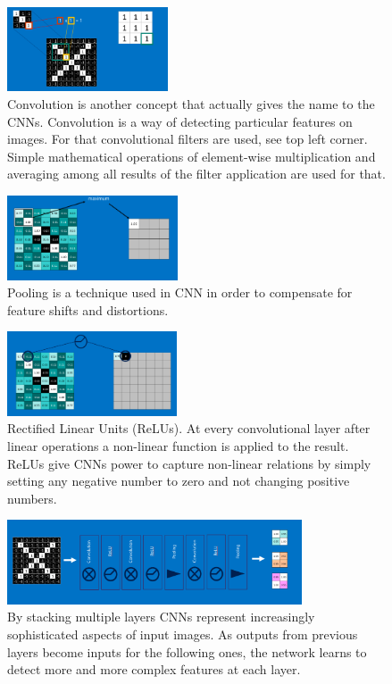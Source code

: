\documentclass[a4paper]{article}
\begin{document}
    \begin{figure}[H]
        \centering
            \includegraphics[width=\textwidth,height=2.5cm,keepaspectratio]{cnn5.png}
        \caption{Convolution is another concept that actually gives the name to the CNNs.
        Convolution is a way of detecting particular features on images. For that convolutional filters
        are used, see top left corner. Simple mathematical operations of element-wise multiplication
        and averaging among all results of the filter application are used for that.}
    \end{figure}
    
    \begin{figure}[H]
        \centering
            \includegraphics[width=\textwidth,height=2.5cm,keepaspectratio]{cnn8.png}
        \caption{Pooling is a technique used in CNN in order to compensate for feature shifts 
        and distortions.}
    \end{figure}
    
    \begin{figure}[H]
        \centering
            \includegraphics[width=\textwidth,height=2.5cm,keepaspectratio]{cnn10.png}
        \caption{Rectified Linear Units (ReLUs). At every convolutional layer after linear operations
        a non-linear function is applied to the result. ReLUs give CNNs power to capture
        non-linear relations by simply setting any negative number to zero and not changing
        positive numbers.}
    \end{figure}
    
    \begin{figure}[H]
        \centering
            \includegraphics[width=\textwidth,height=2.5cm,keepaspectratio]{cnn12.png}
        \caption{By stacking multiple layers CNNs represent increasingly sophisticated aspects of
        input images. As outputs from previous layers become inputs for the following ones, the network
        learns to detect more and more complex features at each layer.}
    \end{figure}
    
\end{document}
